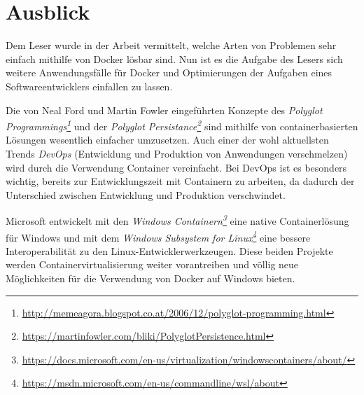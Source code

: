 \section{Ausblick}
Dem Leser wurde in der Arbeit vermittelt, welche Arten von Problemen sehr einfach mithilfe von Docker lösbar sind.
Nun ist es die Aufgabe des Lesers sich weitere Anwendungsfälle für Docker und Optimierungen der Aufgaben eines Softwareentwicklers einfallen zu lassen.

Die von Neal Ford und Martin Fowler eingeführten Konzepte des \emph{Polyglot Programmings\footnote{\url{http://memeagora.blogspot.co.at/2006/12/polyglot-programming.html}}} und der \emph{Polyglot Persistance\footnote{\url{https://martinfowler.com/bliki/PolyglotPersistence.html}}} sind mithilfe von containerbasierten Lösungen wesentlich einfacher umzusetzen.
Auch einer der wohl aktuellsten Trends \emph{DevOps} (Entwicklung und Produktion von Anwendungen verschmelzen) wird durch die Verwendung Container vereinfacht.
Bei DevOps ist es besonders wichtig, bereits zur Entwicklungszeit mit Containern zu arbeiten, da dadurch der Unterschied zwischen Entwicklung und Produktion verschwindet.

Microsoft entwickelt mit den \emph{Windows Containern\footnote{\url{https://docs.microsoft.com/en-us/virtualization/windowscontainers/about/}}} eine native Containerlösung für Windows und mit dem \emph{Windows Subsystem for Linux\footnote{\url{https://msdn.microsoft.com/en-us/commandline/wsl/about}}} eine bessere Interoperabilität zu den Linux-Entwicklerwerkzeugen.
Diese beiden Projekte werden Containervirtualisierung weiter vorantreiben und völlig neue Möglichkeiten für die Verwendung von Docker auf Windows bieten.
